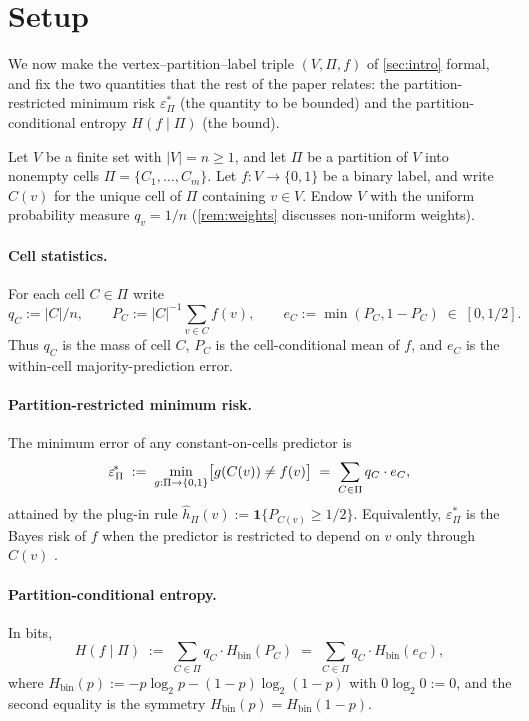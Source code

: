 \documentclass[10pt]{article}
\theoremstyle{definition}
\theoremstyle{remark}
\newcommand{\Hbin}{H_{\mathrm{bin}}}
\newcommand{\eps}{\varepsilon}
\newcommand{\epsP}{\eps^{\!*}_{\Pi}}
\let\Pr\relax
\DeclareMathOperator{\Pr}{\mathbb{P}}
\begin{document}
\section{Setup}\label{sec:setup}

We now make the vertex--partition--label triple $(V, \Pi, f)$ of
\cref{sec:intro} formal, and fix the two quantities that the rest
of the paper relates: the partition-restricted minimum risk
$\epsP$ (the quantity to be bounded) and the
partition-conditional entropy $H(f \mid \Pi)$ (the bound).

Let $V$ be a finite set with $|V| = n \ge 1$, and let $\Pi$ be a
partition of $V$ into nonempty cells $\Pi = \{C_{1}, \ldots, C_{m}\}$.
Let $f : V \to \{0, 1\}$ be a binary label, and write $C(v)$ for
the unique cell of $\Pi$ containing $v \in V$. Endow $V$ with the
uniform probability measure $q_{v} = 1/n$ (\cref{rem:weights}
discusses non-uniform weights).

\paragraph{Cell statistics.} For each cell $C \in \Pi$ write
\[
  q_{C} := |C|/n, \qquad
  P_{C} := |C|^{-1} \sum_{v \in C} f(v), \qquad
  e_{C} := \min(P_{C}, 1 - P_{C}) \;\in\; [0, 1/2].
\]
Thus $q_{C}$ is the mass of cell $C$, $P_{C}$ is the
cell-conditional mean of $f$, and $e_{C}$ is the within-cell
majority-prediction error.

\paragraph{Partition-restricted minimum risk.} The minimum
error of any constant-on-cells predictor is
\begin{equation}\label{eq:bayes-def}
  \epsP \;:=\; \min_{g : \Pi \to \{0,1\}}
    \Pr\bigl[g(C(v)) \neq f(v)\bigr]
  \;=\; \sum_{C \in \Pi} q_{C} \cdot e_{C},
\end{equation}
attained by the plug-in rule
$\hat{h}_{\Pi}(v) := \mathbf{1}\{P_{C(v)} \ge 1/2\}$.
Equivalently, $\epsP$ is the Bayes risk of $f$ when the
predictor is restricted to depend on $v$ only through $C(v)$
\citep[\S2.1]{devroye1996ptpr}.

\paragraph{Partition-conditional entropy.} In bits,
\[
  H(f \mid \Pi)
  \;:=\; \sum_{C \in \Pi} q_{C} \cdot \Hbin(P_{C})
  \;=\; \sum_{C \in \Pi} q_{C} \cdot \Hbin(e_{C}),
\]
where $\Hbin(p) := -p \log_{2} p - (1-p) \log_{2}(1-p)$ with
$0\log_{2}0 := 0$, and the second equality is the symmetry
$\Hbin(p) = \Hbin(1-p)$.
\end{document}
